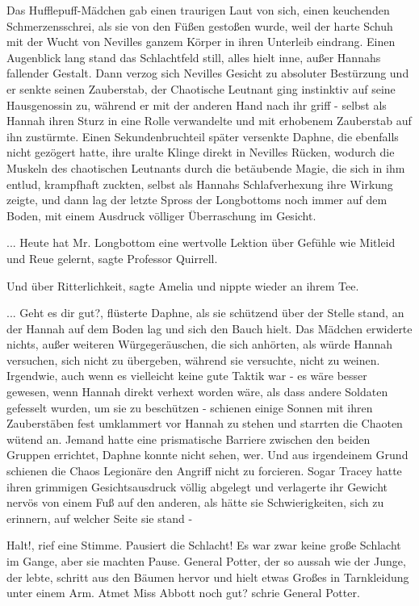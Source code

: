 Das Hufflepuff-Mädchen gab einen traurigen Laut von sich, einen keuchenden
Schmerzensschrei, als sie von den Füßen gestoßen wurde, weil der harte Schuh mit
der Wucht von Nevilles ganzem Körper in ihren Unterleib eindrang. Einen
Augenblick lang stand das Schlachtfeld still, alles hielt inne, außer Hannahs
fallender Gestalt. Dann verzog sich Nevilles Gesicht zu absoluter Bestürzung und
er senkte seinen Zauberstab, der Chaotische Leutnant ging instinktiv auf seine
Hausgenossin zu, während er mit der anderen Hand nach ihr griff - selbst als
Hannah ihren Sturz in eine Rolle verwandelte und mit erhobenem Zauberstab auf
ihn zustürmte. Einen Sekundenbruchteil später versenkte Daphne, die ebenfalls
nicht gezögert hatte, ihre uralte Klinge direkt in Nevilles Rücken, wodurch die
Muskeln des chaotischen Leutnants durch die betäubende Magie, die sich in ihm
entlud, krampfhaft zuckten, selbst als Hannahs Schlafverhexung ihre Wirkung
zeigte, und dann lag der letzte Spross der Longbottoms noch immer auf dem Boden,
mit einem Ausdruck völliger Überraschung im Gesicht.

... \glqq Heute hat Mr. Longbottom eine wertvolle Lektion über Gefühle wie
Mitleid und Reue gelernt\grqq{}, sagte Professor Quirrell.

\glqq Und über Ritterlichkeit\grqq{}, sagte Amelia und nippte wieder an ihrem
Tee.

... \glqq Geht es dir gut?\grqq{}, flüsterte Daphne, als sie schützend über der
Stelle stand, an der Hannah auf dem Boden lag und sich den Bauch hielt. Das
Mädchen erwiderte nichts, außer weiteren Würgegeräuschen, die sich anhörten, als
würde Hannah versuchen, sich nicht zu übergeben, während sie versuchte, nicht zu
weinen. Irgendwie, auch wenn es vielleicht keine gute Taktik war - es wäre
besser gewesen, wenn Hannah direkt verhext worden wäre, als dass andere Soldaten
gefesselt wurden, um sie zu beschützen - schienen einige Sonnen mit ihren
Zauberstäben fest umklammert vor Hannah zu stehen und starrten die Chaoten
wütend an. Jemand hatte eine prismatische Barriere zwischen den beiden Gruppen
errichtet, Daphne konnte nicht sehen, wer. Und aus irgendeinem Grund schienen
die Chaos Legionäre den Angriff nicht zu forcieren. Sogar Tracey hatte ihren
grimmigen Gesichtsausdruck völlig abgelegt und verlagerte ihr Gewicht nervös von
einem Fuß auf den anderen, als hätte sie Schwierigkeiten, sich zu erinnern, auf
welcher Seite sie stand -

\glqq Halt!\grqq{}, rief eine Stimme. \glqq Pausiert die Schlacht!\grqq{} Es war
zwar keine große Schlacht im Gange, aber sie machten Pause. General Potter, der
so aussah wie der Junge, der lebte, schritt aus den Bäumen hervor und hielt
etwas Großes in Tarnkleidung unter einem Arm. \glqq Atmet Miss Abbott noch
gut?\grqq{} schrie General Potter.

